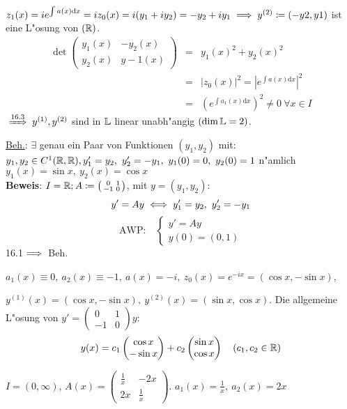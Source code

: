 \documentclass[a4paper,twoside,DIV15,BCOR12mm]{scrbook}
\begin{document}
$z_1(x)=ie^{\int a(x)\text{d}x}=iz_0(x)=i(y_1+iy_2)=-y_2+iy_1\folgt y^{(2)}\da (-y2, y1)$ ist eine L"osung von $(\mathbb{R})$.\\
\begin{eqnarray*}
	\det\begin{pmatrix}
		y_1(x) & -y_2(x)\\
		y_2(x) & y-1(x)
	\end{pmatrix}&=&y_1(x)^2+y_2(x)^2\\
	&=&|z_0(x)|^2=|e^{\int a(x)\text{d}x}|^2\\
	&=&\left(e^{\int a_1(x)\text{d}x}\right)^2\ne 0\ \forall x\in I
\end{eqnarray*}
$\folgtnach{16.3} y^{(1)}, y^{(2)}$ sind in $\mathbb{L}$ linear unabh"angig $(\dim\mathbb{L}=2)$.
\begin{beispiele}
\item \underline{Beh.}: $\exists$ genau ein Paar von Funktionen $(y_1, y_2)$ mit: $y_1, y_2\in C^1(\MdR,\MdR), y_1'=y_2,\ y_2'=-y_1,\ y_1(0)=0,\ y_2(0)=1$ n"amlich $y_1(x)=\sin x,\ y_2(x)=\cos x$\\

\textbf{Beweis}: $I=\MdR; A\da \left(\begin{smallmatrix}0&1\\-1&0\end{smallmatrix}\right)$, mit $y=(y_1, y_2):$
\[
	y'=Ay\iff y_1'=y_2,\ y_2'=-y_1
\]
\[
	\text{AWP:}\quad\begin{cases}
		y'=Ay\\
		y(0)=(0,1)
	\end{cases}
\]
16.1$\implies$ Beh.

$a_1(x)\equiv 0,\ a_2(x)\equiv -1,\ a(x)=-i,\ z_0(x)=e^{-ix}=(\cos x, -\sin x)$,

$y^{(1)}(x)=(\cos x, -\sin x),\ y^{(2)}(x)=(\sin x, \cos x)$. Die allgemeine L"osung von $y'=\left(\begin{smallmatrix}0&1\\-1&0\end{smallmatrix}\right)y:$
\[
	y(x)=c_1\begin{pmatrix}\cos x \\-\sin x\end{pmatrix}+c_2\begin{pmatrix}\sin x\\ \cos x\end{pmatrix}\quad (c_1, c_2\in\mathbb{R})
\]
\item $I=(0,\infty)$, $A(x)=\begin{pmatrix}\frac{1}{x}&-2x\\ 2x&\frac{1}{x}\end{pmatrix}$.
$a_1(x)=\frac{1}{x},\ a_2(x)=2x$


\end{beispiele}
\end{document}

